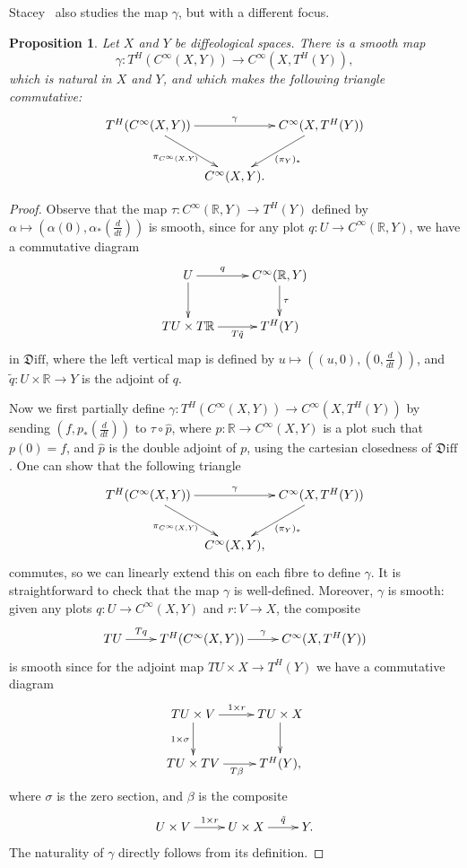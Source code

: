 \documentclass{amsart}
\newtheorem{prop}[de]{Proposition}
\theoremstyle{remark}
\newcommand{\ra}{\to}
\newcommand{\lra}{\longrightarrow}
\newcommand{\Diff}{{\mathfrak{D}\mathrm{iff}}}
\def \R{\mathbb{R}}
\begin{document}
Stacey~\cite{St2} also studies the map $\gamma$, but with a different focus.

\begin{prop}\label{prop:map}
Let $X$ and $Y$ be diffeological spaces.
There is a smooth map
\[
\gamma:T^H(C^\infty(X,Y)) \lra C^\infty(X,T^H (Y)),
\]
which is natural in $X$ and $Y$,
and which makes the following triangle commutative:
\[
\xymatrix@C5pt{T^H(C^\infty(X,Y)) \ar[rr]^\gamma \ar[dr]_{\pi_{C^\infty(X,Y)}}
& & C^\infty(X,T^H(Y)) \ar[dl]^{(\pi_Y)_*} \\ & C^\infty(X,Y).}
\]
\end{prop}
\begin{proof}
Observe that the map $\tau:C^\infty(\R,Y) \ra T^H(Y)$ defined by
$\alpha \mapsto (\alpha(0),\alpha_* (\frac{d}{dt}))$ is smooth,
since for any plot $q:U \ra C^\infty(\R,Y)$,
we have a commutative diagram
\[
\xymatrix{U \ar[d] \ar[r]^-q & C^\infty(\R,Y) \ar[d]^-\tau \\
          TU \times T \R \ar[r]_-{T \tilde{q}} & T^H(Y)}
\]
in $\Diff$,
where the left vertical map is defined by $u \mapsto ((u,0),(0,\frac{d}{dt}))$,
and $\tilde{q}:U \times \R \ra Y$ is the adjoint of $q$.

Now we first partially define $\gamma:T^H(C^\infty(X,Y)) \ra C^\infty(X,T^H (Y))$
by sending $(f,p_*(\frac{d}{dt}))$ to $\tau \circ \hat{p}$,
where $p:\R \ra C^\infty(X,Y)$ is a plot such that $p(0)=f$,
and $\hat{p}$ is the double adjoint of $p$,
using the cartesian closedness of $\Diff$.
One can show that the following triangle
\[
\xymatrix@C5pt{T^H(C^\infty(X,Y)) \ar[rr]^\gamma \ar[dr]_{\pi_{C^\infty(X,Y)}} & & C^\infty(X,T^H(Y)) \ar[dl]^{(\pi_Y)_*} \\ & C^\infty(X,Y),}
\]
commutes, so we can linearly extend this on each fibre to define $\gamma$.
It is straightforward to check that the map $\gamma$ is well-defined.
Moreover, $\gamma$ is smooth:
given any plots $q:U \ra C^\infty(X,Y)$ and $r:V \ra X$, the composite
\[
\xymatrix{TU \ar[r]^-{Tq} & T^H(C^\infty(X,Y)) \ar[r]^\gamma & C^\infty(X,T^H(Y))}
\]
is smooth since for the adjoint map $TU \times X \ra T^H(Y)$
we have a commutative diagram
\[
\xymatrix{TU \times V \ar[r]^{1 \times r} \ar[d]_{1 \times \sigma} & TU \times X \ar[d] \\ TU \times TV \ar[r]_{T \beta} & T^H(Y),}
\]
where $\sigma$ is the zero section, and $\beta$ is the composite
\[
\xymatrix{U \times V \ar[r]^{1 \times r} & U \times X \ar[r]^-{\tilde{q}} & Y.}
\]
The naturality of $\gamma$ directly follows from its definition.
\end{proof}
\end{document}
